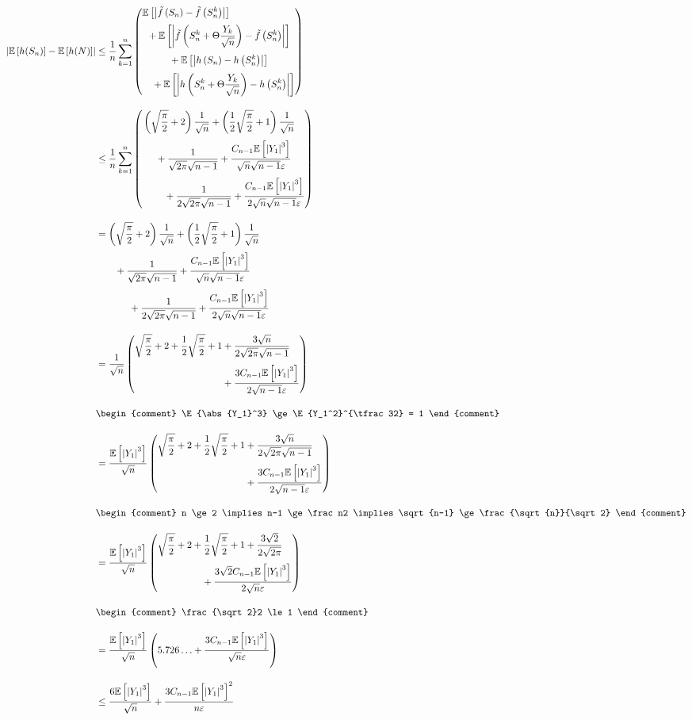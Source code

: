 \begin{align}
  \abs{\E{h(S_n)}-\E{h(N)}}
  &\le \frac 1n \sum_{k=1}^n \left(
  \begin{multlined}
      \E{\abs{\ft{S_n} - \ft{S_n^k}}} \nl
      +\E{\abs{\ft{ S_n^k +\Theta \frac{Y_k}{\sqrt n} } - \ft{ S_n^k }}} \nl
      +\E{\abs{\h{S_n} - \h{ S_n^k }}} \nl
      +\E{\abs{\h{ S_n^k +\Theta \frac{Y_k}{\sqrt n} } - \h{ S_n^k }}}
    \end{multlined}
  \right) \bnl
  &\le \frac 1n \sum_{k=1}^n \left(
    \begin{multlined}
      \left(\sqrt{\frac\pi2}+2\right) \frac1{\sqrt n} +\left(\frac 12\sqrt{\frac \pi2}+1\right)\frac{1}{\sqrt n}\nl
      +\frac{1}{\sqrt{2\pi}\sqrt{n-1}}+\frac{C_{n-1} \E{\abs{Y_1}^3} }{\sqrt{n}\sqrt{n-1}\epsilon}\nl
      +\frac{1}{2\sqrt{2\pi}\sqrt{n-1}}+\frac{C_{n-1} \E{\abs{Y_1}^3} }{2\sqrt{n}\sqrt{n-1}\epsilon}
    \end{multlined}
  \right) \bnl
  &
  \begin{multlined}
    = \left(\sqrt{\frac\pi2}+2\right) \frac1{\sqrt n} +\left(\frac 12\sqrt{\frac \pi2}+1\right)\frac{1}{\sqrt n}\nl
    +\frac{1}{\sqrt{2\pi}\sqrt{n-1}}+\frac{C_{n-1} \E{\abs{Y_1}^3} }{\sqrt{n}\sqrt{n-1}\epsilon}\nl
    +\frac{1}{2\sqrt{2\pi}\sqrt{n-1}}+\frac{C_{n-1} \E{\abs{Y_1}^3} }{2\sqrt{n}\sqrt{n-1}\epsilon}
  \end{multlined} \bnl
  & = \frac{1}{\sqrt{n}} \left(
  \begin{multlined}
    \sqrt{\frac\pi2} + 2 + \frac 12 \sqrt{\frac \pi2} + 1 +\frac{3\sqrt n}{2\sqrt{2\pi}\sqrt{n-1}} \nl
    + \frac{3C_{n-1} \E{\abs{Y_1}^3} }{2\sqrt{n-1}\epsilon}
  \end{multlined}
  \right) \bnl
  &
  \begin{comment}
    \E{\abs{Y_1}^3} \ge \E{Y_1^2}^{\tfrac 32} = 1
  \end{comment} \bnl
  & = \frac{ \E{\abs{Y_1}^3}  }{\sqrt{n}} \left(
  \begin{multlined}
    \sqrt{\frac\pi2} + 2 + \frac 12 \sqrt{\frac \pi2} + 1 +\frac{3\sqrt n}{2\sqrt{2\pi}\sqrt{n-1}} \nl
    + \frac{3C_{n-1} \E{\abs{Y_1}^3} }{2\sqrt{n-1}\epsilon}
  \end{multlined}
  \right) \bnl
  &
  \begin{comment}
    n \ge 2 \implies n-1 \ge \frac n2 \implies \sqrt{n-1} \ge \frac{\sqrt{n}}{\sqrt 2} 
  \end{comment} \bnl
  & = \frac{ \E{\abs{Y_1}^3}  }{\sqrt{n}} \left(
  \begin{multlined}
    \sqrt{\frac\pi2} + 2 + \frac 12 \sqrt{\frac \pi2} + 1 +\frac{3\sqrt 2}{2\sqrt{2\pi}} \nl
    + \frac{3 \sqrt{2} C_{n-1} \E{\abs{Y_1}^3} }{2\sqrt{n}\epsilon}
  \end{multlined}
  \right) \bnl
  &
  \begin{comment}
    \frac{\sqrt 2}2 \le 1
  \end{comment} \bnl
  & = \frac{ \E{\abs{Y_1}^3}  }{\sqrt{n}} \left( 5.726\ldots + \frac{3 C_{n-1} \E{\abs{Y_1}^3} }{\sqrt{n}\epsilon}
  \right) \bnl
  &\le \frac{6 \E{\abs{Y_1}^3} }{\sqrt n} + \frac{3 C_{n-1} \E{\abs{Y_1}^3}^2}{n\epsilon}
\end{align}

